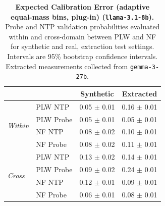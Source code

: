 \begin{table}[ht]
\centering
\begin{tabular}{ll cc}
\toprule
& & Synthetic & Extracted \\
\midrule
\multirow{4}{*}{\textit{Within}}
& PLW NTP & 0.05 $\pm$ 0.01 & 0.16 $\pm$ 0.01 \\
& PLW Probe & 0.05 $\pm$ 0.01 & 0.05 $\pm$ 0.01 \\
& NF NTP & 0.08 $\pm$ 0.02 & 0.10 $\pm$ 0.01 \\
& NF Probe & 0.08 $\pm$ 0.02 & 0.11 $\pm$ 0.01 \\
\midrule
\multirow{4}{*}{\textit{Cross}}
& PLW NTP & 0.13 $\pm$ 0.02 & 0.14 $\pm$ 0.01 \\
& PLW Probe & 0.09 $\pm$ 0.02 & 0.24 $\pm$ 0.01 \\
& NF NTP & 0.12 $\pm$ 0.01 & 0.09 $\pm$ 0.01 \\
& NF Probe & 0.06 $\pm$ 0.01 & 0.08 $\pm$ 0.01 \\
\bottomrule
\end{tabular}
\caption{\textbf{Expected Calibration Error (adaptive equal-mass bins, plug-in) (\texttt{llama-3.1-8b}).} Probe and NTP validation probabilities evaluated within and cross-domain between PLW and NF for synthetic and real, extraction test settings. Intervals are 95\% bootstrap confidence intervals. Extracted measurements collected from \texttt{gemma-3-27b}.}
\label{tab:llama-3.1-8b-gemma-3-27b-pond_nfix-ece_em}
\end{table}
